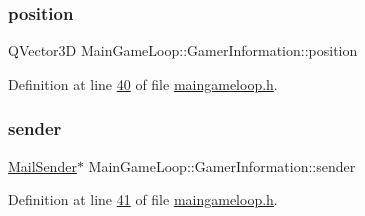 \subsubsection{\texorpdfstring{position}{position}}
{\footnotesize\ttfamily Q\+Vector3D Main\+Game\+Loop\+::\+Gamer\+Information\+::position}



Definition at line \hyperlink{a00092_source_l00040}{40} of file \hyperlink{a00092_source}{maingameloop.\+h}.

\mbox{\label{a00213_aebab9469416fa837ba9140f2bf2b280d}} 
\subsubsection{\texorpdfstring{sender}{sender}}
{\footnotesize\ttfamily \hyperlink{a00205}{Mail\+Sender}$\ast$ Main\+Game\+Loop\+::\+Gamer\+Information\+::sender}



Definition at line \hyperlink{a00092_source_l00041}{41} of file \hyperlink{a00092_source}{maingameloop.\+h}.

